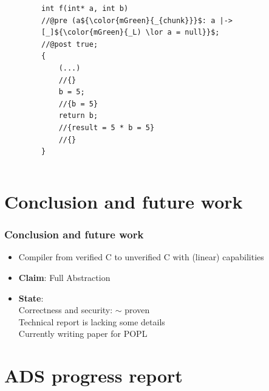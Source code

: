 \documentclass{beamer}
\begin{document}
\begin{frame}[fragile]
\begin{columns}
\begin{column}{0.08\textwidth}
\end{column}

\begin{column}{0.56\textwidth}

\begin{figure}[h]
  \centering
\begin{lstlisting}[style=CStyleNoNum, captionpos = t,title = Source]
int f(int* a, int b)
//@pre (a${\color{mGreen}{_{chunk}}}$: a |-> [_]${\color{mGreen}{_L) \lor a = null}}$;
//@post true;
{
	(...)
	//{}
	b = 5;
	//{b = 5} 
	return b;
	//{result = 5 * b = 5}
	//{}
}
\end{lstlisting}
\end{figure}   

\end{column}
\end{columns}

\end{frame}
\fi
\section{Conclusion and future work}

\begin{frame}
\frametitle{Conclusion and future work}
\begin{itemize}
\item Compiler from verified C to unverified C with (linear) capabilities 
\item \textbf{Claim}: Full Abstraction\\
\item \textbf{State}: \\
\qquad Correctness and security: $\sim$ proven\\
  \qquad\qquad Technical report is lacking some details\\
 \qquad Currently writing paper for POPL\\
\end{itemize}
\end{frame}

\section{ADS progress report}
\end{document}
